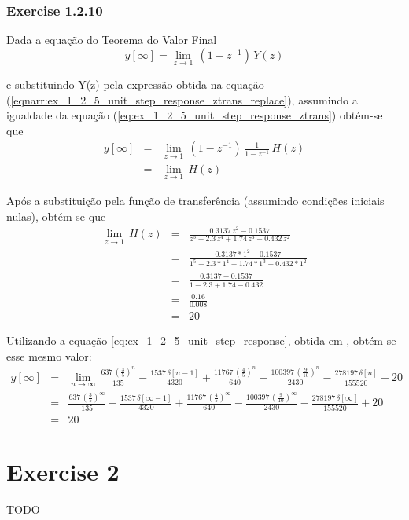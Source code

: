 \documentclass[a4paper]{article}
\begin{document}
\subsubsection{Exercise 1.2.10}
\noindent Dada a equação do Teorema do Valor Final
\begin{equation}
	y[\infty] = \lim_{z \to 1} \, (1 - z^{-1}) \, Y(z)
\end{equation}

\noindent e substituindo Y(z) pela expressão obtida na equação (\ref{eqnarr:ex_1_2_5_unit_step_response_ztrans_replace}), assumindo a igualdade da equação (\ref{eq:ex_1_2_5_unit_step_response_ztrans}) obtém-se que
\begin{eqnarray}
	y[\infty] & = & \lim_{z \to 1} \, (1 - z^{-1}) \, \frac{1}{1 - z^{-1}} \, H(z) \\
	& = & \lim_{z \to 1} \, H(z)
\end{eqnarray}

\noindent Após a substituição pela função de transferência (assumindo condições iniciais nulas), obtém-se que
\begin{eqnarray}
	\lim_{z \to 1} \, H(z) & = & \frac{0.3137 \, z^{2} - 0.1537}{z^{5} - 2.3 \, z^{4} + 1.74 \, z^{3} - 0.432 \, z^{2}} \\
	& = & \frac{0.3137 * 1^{2} - 0.1537}{1^{5} - 2.3 * 1^{4} + 1.74 * 1^{3} - 0.432 * 1^{2}} \\
	& = & \frac{0.3137 - 0.1537}{1 - 2.3 + 1.74 - 0.432} \\
	& = & \frac{0.16}{0.008} \\
	& = & 20
\end{eqnarray}

\noindent Utilizando a equação \ref{eq:ex_1_2_5_unit_step_response}, obtida em \emph{}, obtém-se esse mesmo valor:
\begin{eqnarray}
	y[\infty] & = & \lim_{n \to \infty} \, \frac{637 \, \left(\frac{3}{5}\right)^n}{135} - \frac{1537 \, \delta[n - 1]}{4320} + \frac{11767 \, \left(\frac{4}{5}\right)^n}{640} - \frac{100397 \, \left(\frac{9}{10}\right)^n}{2430} - \frac{278197 \, \delta[n]}{155520} + 20 \\
	& = & \frac{637 \, \left(\frac{3}{5}\right)^\infty}{135} - \frac{1537 \, \delta[\infty - 1]}{4320} + \frac{11767 \, \left(\frac{4}{5}\right)^\infty}{640} - \frac{100397 \, \left(\frac{9}{10}\right)^\infty}{2430} - \frac{278197 \, \delta[\infty]}{155520} + 20 \\
	& = & 20
\end{eqnarray}

\section{Exercise 2}
TODO
\end{document}
